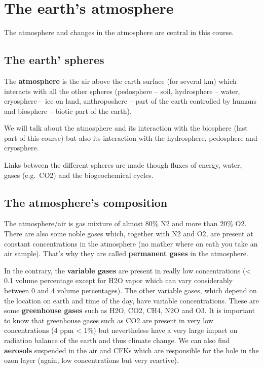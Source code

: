 \documentclass[12pt,oneside]{book}
\begin{document}

\section{The earth's atmosphere}\label{the-earths-atmosphere}

The atmosphere and changes in the atmosphere are central in this course.

\subsection{The earth' spheres}\label{the-earth-spheres}

The \textbf{atmosphere} is the air above the earth surface (for several
km) which interacts with all the other spheres (pedosphere -- soil,
hydrosphere -- water, cryosphere -- ice on land, anthroposhere -- part
of the earth controlled by humans and biosphere -- biotic part of the
earth).

We will talk about the atmosphere and its interaction with the biosphere
(last part of this course) but also its interaction with the
hydrosphere, pedosphere and cryosphere.

Links between the different spheres are made though fluxes of energy,
water, gases (e.g.~CO2) and the biogeochemical cycles.

\subsection{The atmosphere's
composition}\label{the-atmospheres-composition}

The atmosphere/air is gas mixture of almost 80\% N2 and more than 20\%
O2. There are also some noble gases which, together with N2 and O2, are
present at constant concentrations in the atmosphere (no mather where on
eath you take an air sample). That's why they are called
\textbf{permanent gases} in the atmosphere.

In the contrary, the \textbf{variable gases} are present in really low
concentrations (\textless{} 0.1 volume percentage except for H2O vapor
which can vary considerably between 0 and 4 volume percentages). The
other variable gases, which depend on the location on earth and time of
the day, have variable concentrations. These are some \textbf{greenhouse
gases} such as H2O, CO2, CH4, N2O and O3. It is important to know that
greenhouse gases such as CO2 are present in very low concentrations (4
ppm \textless{} 1\%) but nevertheless have a very large impact on
radiation balance of the earth and thus climate change. We can also find
\textbf{aerosols} suspended in the air and CFKs which are responsible
for the hole in the ozon layer (again, low concentrations but very
reactive).
\end{document}
